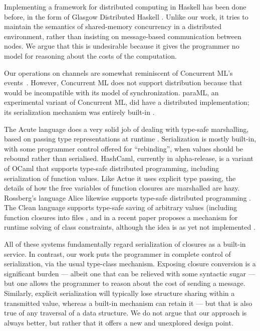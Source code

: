 \documentclass[preprint]{sigplanconf}
\begin{document}
Implementing a framework for distributed computing in Haskell has been
done before, in the form of Glasgow Distributed Haskell
\cite{gdh2001}. Unlike our work, it tries to maintain the semantics of
shared-memory concurrency in a distributed environment, rather than
insisting on message-based communication between nodes. We argue that this is 
undesirable because it gives the programmer no model for reasoning about the costs of the computation.  

Our operations on channels are somewhat reminiscent of Concurrent ML's events~\cite{reppy:book}.
However, Concurrent ML does not support distribution because that would be incompatible with its
model of synchronization.  paraML, an experimental variant of Concurrent ML, did have
a distributed implementation; its serialization mechanism was entirely built-in \cite{bailey:paraml}.

The Acute language does a very solid job of dealing with type-safe
marshalling, based on passing type representations at runtime
\cite{acute:jfp}.  Serialization is mostly built-in, with some
programmer control offered for ``rebinding'', when values should be
rebound rather than serialised.  HashCaml, currently in alpha-release, is a
variant of OCaml that supports type-safe distributed
programming, including serialization of function values.  Like Actue
it uses explicit type passing, the details of how the free variables
of function closures are marshalled are hazy.  Rossberg's language
Alice likewise supports type-safe distributed programming
\cite{rossberg:alice}.  
The Clean language supports type-safe saving of arbitrary values (including
function closures into files \cite{clean:dynamic-io}, and in a recent
paper proposes a mechanism for runtime solving of class constraints, although
the idea is as yet not implemented
\cite[Sect 4.2]{clean:wgp10}.

All of these systems fundamentally regard serialization of closures
as a built-in service.  In contrast, our work puts the programmer in
complete control of serialization, via the usual type-class mechanism.
Exposing closure conversion is a significant burden --- albeit one that can be
relieved with some syntactic sugar --- but one allows the
programmer to reason about the cost of sending a message.
Similarly, explicit serialization will typically lose structure 
sharing within a transmitted value, whereas a built-in mechanism can retain it
--- but that is also true of any traversal of a data structure.
We do not argue that our approach is always better, but rather that it offers
a new and unexplored design point.
\end{document}
